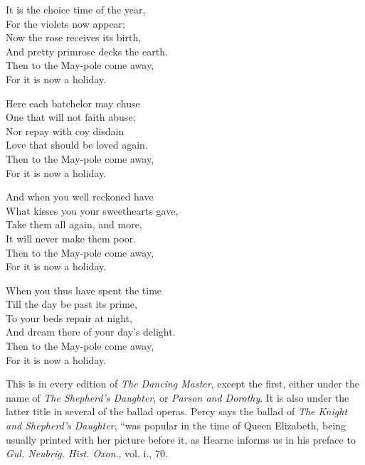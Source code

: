 \settowidth{\versewidth}{What kisses you your sweethearts gave,}
\begin{dcverse}\begin{patverse}
It is the choice time of the year,\\
For the violets now appear;\\
Now the rose receives its birth,\\
And pretty primrose decks the earth.\\
Then to the May-pole come away,\\
For it is now a holiday.
\end{patverse}

\begin{patverse}
Here each batchelor may chuse\\
One that will not faith abuse;\\
Nor repay with coy disdain\\
Love that should be loved again.\\
Then to the May-pole come away,\\
For it is now a holiday.
\end{patverse}

\begin{patverse}
And when you well reckoned have\\
What kisses you your sweethearts gave,\\
Take them all again, and more,\\
It will never make them poor.\\
Then to the May-pole come away,\\
For it is now a holiday.
\end{patverse}

\begin{patverse}
When you thus have spent the time\\
Till the day be past its prime,\\
To your beds repair at night,\\
And dream there of your day’s delight.\\
Then to the May-pole come away,\\
For it is now a holiday.
\end{patverse}
\end{dcverse}


\small %
This is in every edition of \textit{The Dancing Master}, except the first, either under
the name of \textit{The Shepherd’s Daughter}, or \textit{Parson and Dorothy}. It is also under
the latter title in several of the ballad operas. Percy says the ballad of \textit{The
Knight and Shepherd’s Daughter}, “was popular in the time of Queen Elizabeth,
being usually printed with her picture before it, as Hearne informs us in his preface
to \textit{Gul. Neubrig. Hist. Oxon}., vol. i., 70.

